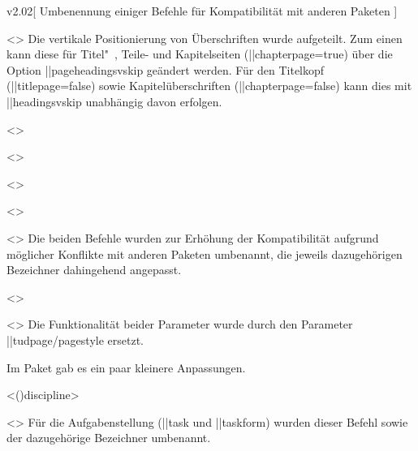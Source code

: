 \begin{Changes}{v2.02}[%
  Umbenennung einiger Befehle für Kompatibilität mit anderen Paketen%
]
\begin{Obsolete}
  {}
  <>
\printdeclarationlist
%
Die vertikale Positionierung von Überschriften wurde aufgeteilt. Zum einen kann 
diese für Titel"~, Teile- und Kapitelseiten (\Option||{chapterpage=true}) über 
die Option \Option||{pageheadingsvskip} geändert werden. Für den Titelkopf
(\Option||{titlepage=false}) sowie Kapitelüberschriften 
(\Option||{chapterpage=false}) kann dies mit \Option||{headingsvskip} 
unabhängig davon erfolgen.
\end{Obsolete}

\begin{Obsolete}
  {}
  <>
\begin{Obsolete}
  {}
  <>
\begin{Obsolete}
  {}
  <>
\begin{Obsolete}
  {}
  <>
\begin{Obsolete}
  {}
  <>
\printdeclarationlist
%
Die beiden Befehle wurden zur Erhöhung der Kompatibilität aufgrund möglicher 
Konflikte mit anderen Paketen umbenannt, die jeweils dazugehörigen Bezeichner 
dahingehend angepasst.
\end{Obsolete}
\end{Obsolete}
\end{Obsolete}
\end{Obsolete}
\end{Obsolete}

\begin{Declaration*}
  {}
\begin{Obsolete}
  {}
  <>
\begin{Obsolete}
  {}
  <>
\printdeclarationlist
%
Die Funktionalität beider Parameter wurde durch den Parameter 
\Environment||{tudpage/pagestyle} ersetzt.
\end{Obsolete}
\end{Obsolete}
\end{Declaration*}



%
\begin{Entity}{}
Im Paket  gab es ein paar kleinere Anpassungen.
\begin{Obsolete}
  {}
  <\Macro(){discipline}>
\begin{Obsolete}
  {}
  <>
\printdeclarationlist
%
Für die Aufgabenstellung (\Environment||{task} und \Macro||{taskform}) wurden 
dieser Befehl sowie der dazugehörige Bezeichner umbenannt.
\end{Obsolete}
\end{Obsolete}


\end{Entity}
\end{Changes}
